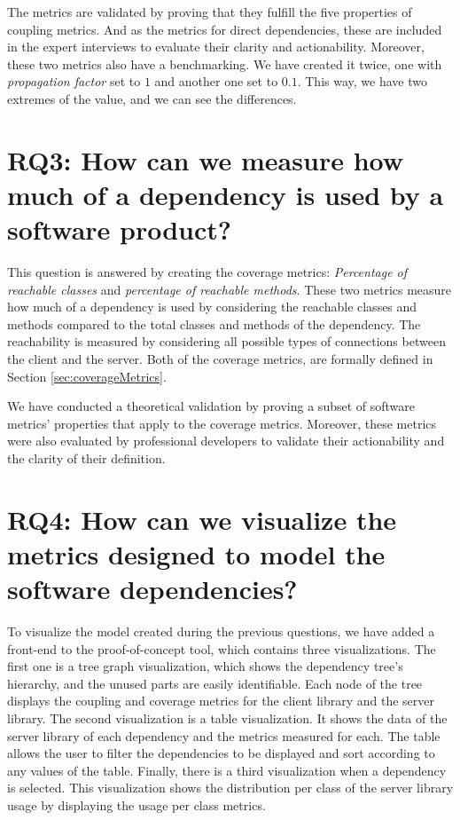 The metrics are validated by proving that they fulfill the five properties of coupling metrics. And as the metrics for direct dependencies, these are included in the expert interviews to evaluate their clarity and actionability. Moreover, these two metrics also have a benchmarking. We have created it twice, one with \textit{propagation factor} set to $1$ and another one set to $0.1$. This way, we have two extremes of the value, and we can see the differences.

\section{RQ3: How can we measure how much of a dependency is used by a software product?}

This question is answered by creating the coverage metrics: \textit{Percentage of reachable classes} and \textit{percentage of reachable methods}. These two metrics measure how much of a dependency is used by considering the reachable classes and methods compared to the total classes and methods of the dependency. The reachability is measured by considering all possible types of connections between the client and the server. Both of the coverage metrics, are formally defined in Section \ref{sec:coverageMetrics}.

We have conducted a theoretical validation by proving a subset of software metrics' properties that apply to the coverage metrics. Moreover, these metrics were also evaluated by professional developers to validate their actionability and the clarity of their definition.


\section{RQ4: How can we visualize the metrics designed to model the software dependencies?}

To visualize the model created during the previous questions, we have added a front-end to the proof-of-concept tool, which contains three visualizations. The first one is a tree graph visualization, which shows the dependency tree's hierarchy, and the unused parts are easily identifiable. Each node of the tree displays the coupling and coverage metrics for the client library and the server library. The second visualization is a table visualization. It shows the data of the server library of each dependency and the metrics measured for each. The table allows the user to filter the dependencies to be displayed and sort according to any values of the table. Finally, there is a third visualization when a dependency is selected. This visualization shows the distribution per class of the server library usage by displaying the usage per class metrics.

